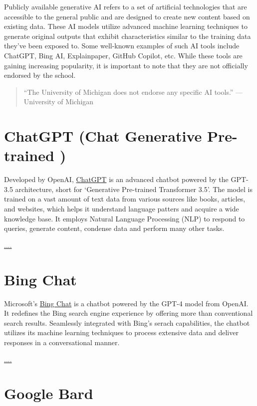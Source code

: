 \documentclass[
]{book}
\begin{document}
Publicly available generative AI refers to a set of artificial technologies that are accessible to the general public and are designed to create new content based on existing data. These AI models utilize advanced machine learning techniques to generate original outputs that exhibit characteristics similar to the training data they've been exposed to. Some well-known examples of such AI tools include ChatGPT, Bing AI, Explainpaper, GitHub Copilot, etc. While these tools are gaining increasing popularity, it is important to note that they are not officially endorsed by the school.

\begin{quote}
``The University of Michigan does not endorse any specific AI tools.'' --- University of Michigan
\end{quote}

\hypertarget{chatgpt-chat-generative-pre-trained}{%
\section{ChatGPT (Chat Generative Pre-trained )}\label{chatgpt-chat-generative-pre-trained}}

Developed by OpenAI, \href{https://chat.openai.com/}{ChatGPT} is an advanced chatbot powered by the GPT-3.5 architecture, short for `Generative Pre-trained Transformer 3.5'. The model is trained on a vast amount of text data from various sources like books, articles, and websites, which helps it understand language patters and acquire a wide knowledge base. It employs Natural Language Processing (NLP) to respond to queries, generate content, condense data and perform many other tasks.

\url{....}

\hypertarget{bing-chat}{%
\section{Bing Chat}\label{bing-chat}}

Microsoft's \href{https://www.microsoft.com/en-us/edge/features/bing-chat?form=MT00D8}{Bing Chat} is a chatbot powered by the GPT-4 model from OpenAI. It redefines the Bing search engine experience by offering more than conventional search results. Seamlessly integrated with Bing's serach capabilities, the chatbot utilizes its machine learning techniques to process extensive data and deliver responses in a conversational manner.

\url{....}

\hypertarget{google-bard}{%
\section{Google Bard}\label{google-bard}}
\end{document}
